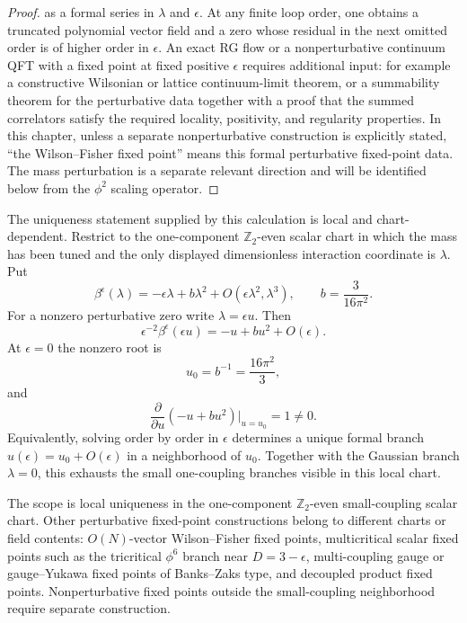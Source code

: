 \begin{proof}
as a formal series in \(\lambda\) and \(\epsilon\).  At any finite loop order,
one obtains a truncated polynomial vector field and a zero whose residual in
the next omitted order is of higher order in \(\epsilon\).  An exact RG flow
or a nonperturbative continuum QFT with a fixed point at fixed positive
\(\epsilon\) requires additional input: for example a constructive Wilsonian
or lattice continuum-limit theorem, or a summability theorem for the
perturbative data together with a proof that the summed correlators satisfy
the required locality, positivity, and regularity properties.  In this
chapter, unless a separate nonperturbative construction is explicitly stated,
``the Wilson--Fisher fixed point'' means this formal perturbative fixed-point
data.  The mass perturbation is a separate relevant direction and will be
identified below from the \(\phi^2\) scaling operator.
\end{proof}

\begin{remark}
\label{rem:wilson-fisher-local-uniqueness}
The uniqueness statement supplied by this calculation is local and
chart-dependent.  Restrict to the one-component \(\mathbb Z_2\)-even scalar
chart in which the mass has been tuned and the only displayed dimensionless
interaction coordinate is \(\lambda\).  Put
\[
  \beta^\epsilon(\lambda)
  =
  -\epsilon\lambda+b\lambda^2+O(\epsilon\lambda^2,\lambda^3),
  \qquad
  b=\frac{3}{16\pi^2}.
\]
For a nonzero perturbative zero write \(\lambda=\epsilon u\).  Then
\[
  \epsilon^{-2}\beta^\epsilon(\epsilon u)
  =
  -u+bu^2+O(\epsilon).
\]
At \(\epsilon=0\) the nonzero root is
\[
  u_0=b^{-1}=\frac{16\pi^2}{3},
\]
and
\[
  \frac{\partial}{\partial u}(-u+bu^2)\bigg|_{u=u_0}=1\neq0 .
\]
Equivalently, solving order by order in \(\epsilon\) determines a unique
formal branch \(u(\epsilon)=u_0+O(\epsilon)\) in a neighborhood of \(u_0\).
Together with the Gaussian branch \(\lambda=0\), this exhausts the small
one-coupling branches visible in this local chart.

The scope is local uniqueness in the one-component \(\mathbb Z_2\)-even
small-coupling scalar chart.  Other perturbative fixed-point constructions
belong to different charts or field contents: \(O(N)\)-vector
Wilson--Fisher fixed points, multicritical scalar fixed points such as the
tricritical \(\phi^6\) branch near \(D=3-\epsilon\), multi-coupling gauge or
gauge--Yukawa fixed points of Banks--Zaks type, and decoupled product fixed
points.  Nonperturbative fixed points outside the small-coupling neighborhood
require separate construction.
\end{remark}

